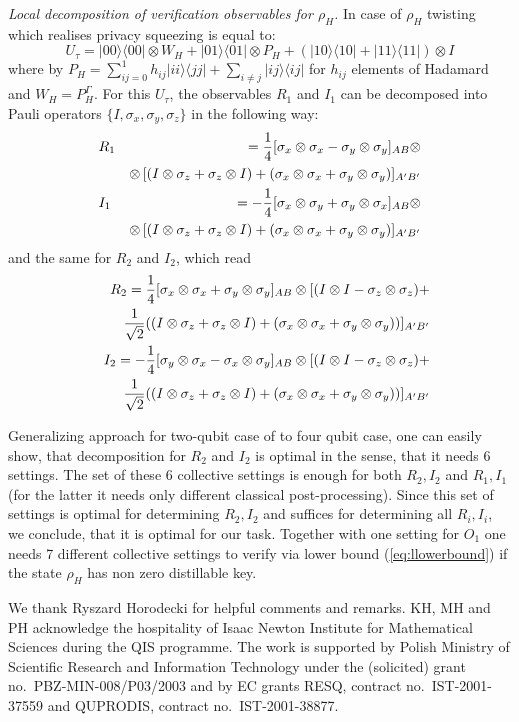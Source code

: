 \documentclass[twocolumn,prl,aps]{revtex4}
\def\be{\begin{equation}}
\def\ee{\end{equation}}
\def\ben{\begin{eqnarray}}
\def\een{\end{eqnarray}}
\def\>{\rangle}
\def\<{\langle}
\def\ot{\otimes}
\begin{document}
{\it Local decomposition of verification observables for $\rho_H$.}
In case of $\rho_H$ twisting which realises privacy squeezing is equal to:
\be
U_\tau = |00\>\<00|\ot W_H + |01\>\<01| \ot P_H + (|10\>\<10| + |11\>\<11|)\ot I
\ee
where by $P_H = \sum_{ij=0}^1 h_{ij}|ii\>\<jj| + \sum_{i\neq j} |ij\>\<ij|$ for $h_{ij}$ 
elements of Hadamard and $W_H = P_H^{\Gamma}$. 
For this $U_\tau$,
the observables $R_1$ and $I_1$ can be decomposed into Pauli operators $\{I,\sigma_x ,\sigma_y, \sigma_z\}$ in the 
following way:
\ben
&R_1& = {1\over 4}[\sigma_x \ot \sigma_x -\sigma_y \ot \sigma_y]_{AB} \ot \nonumber \\ 
&&\ot\, [(I\ot \sigma_z + \sigma_z\ot I) + (\sigma_x \ot \sigma_x + \sigma_y\ot \sigma_y)]_{A'B'} 
\nonumber \\ 
&I_1& = -{1\over 4}[\sigma_x \ot \sigma_y + \sigma_y \ot \sigma_x]_{AB}\ot  \nonumber \\
&&\ot\, [(I\ot \sigma_z + \sigma_z\ot I) + (\sigma_x \ot \sigma_x +\sigma_y \ot \sigma_y)]_{A'B'}
\nonumber 
\een
and the same for $R_2$ and $I_2$, which read
\ben
&&R_2 = {1\over 4}[\sigma_x \ot \sigma_x +\sigma_y \ot \sigma_y]_{AB}  \ot [(I\ot I - \sigma_z\ot\sigma_z)+  \nonumber \\
&&{1\over \sqrt{2}}((I\ot \sigma_z + \sigma_z\ot I)  + (\sigma_x \ot \sigma_x +\sigma_y \ot \sigma_y))]_{A'B'}\nonumber \\
&&I_2 = -{1\over 4}[\sigma_y \ot \sigma_x - \sigma_x \ot \sigma_y]_{AB}
\ot [(I\ot I - \sigma_z\ot\sigma_z)+  \nonumber \\
&&{1\over \sqrt{2}}((I\ot \sigma_z + \sigma_z\ot I) + (\sigma_x \ot \sigma_x +\sigma_y \ot \sigma_y))]_{A'B'}\nonumber
\een

Generalizing approach for two-qubit case of \cite{opt-local-decomp,opt-multi-local-decomp} to four qubit case, one can easily show, 
that decomposition for $R_2$ and $I_2$ is optimal in the sense, 
that it needs $6$ settings. The set of these 6 collective settings 
is enough for both  $R_2, I_2$ and $R_1, I_1$ (for the latter it needs 
only different classical post-processing). Since this set of settings is optimal for 
determining $R_2,I_2$ and suffices for determining all $R_i, I_i$, we conclude, that 
it is optimal for our task. Together with one setting for $O_1$ one needs 7 different
collective settings to verify via lower bound (\ref{eq:llowerbound}) if the state $\rho_H$ has
non zero distillable key. 
\vspace{1cm}

We thank Ryszard Horodecki for helpful comments and remarks.
KH, MH and PH acknowledge the hospitality of 
Isaac Newton Institute for Mathematical Sciences during the QIS programme. 
The work is supported by Polish Ministry of Scientific Research and Information
Technology under the (solicited) grant no.~PBZ-MIN-008/P03/2003 and by
EC grants RESQ, contract no.~IST-2001-37559 and QUPRODIS, contract
no.~IST-2001-38877.

%

%
\end{document}
